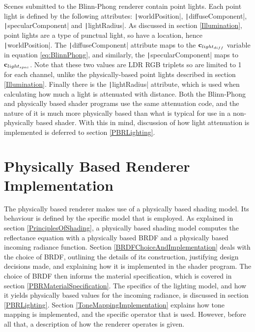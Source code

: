Scenes submitted to the Blinn-Phong renderer contain point lights. Each point light is defined by the following attributes: \texttt|worldPosition|, \texttt|diffuseComponent|, \texttt|specularComponent| and \texttt|lightRadius|. As discussed in section \ref{Illumination}, point lights are a type of punctual light, so have a location, hence \texttt|worldPosition|. The \texttt|diffuseComponent| attribute maps to the \begin{math}\mathbf{c}_{light_{diff}}\end{math} variable in equation \ref{eq:BlinnPhong}, and similarly, the \texttt|specularComponent| maps to \begin{math}\mathbf{c}_{light_{spec}}\end{math}. Note that these two values are LDR RGB triplets so are limited to 1 for each channel, unlike the physically-based point lights described in section \ref{Illumination}. Finally there is the \texttt|lightRadius| attribute, which is used when calculating how much a light is attenuated with distance. Both the Blinn-Phong and physically based shader programs use the same attenuation code, and the nature of it is much more physically based than what is typical for use in a non-physically based shader. With this in mind, discussion of how light attenuation is implemented is deferred to section \ref{PBRLighting}.

\section{Physically Based Renderer Implementation} \label{PBRImplementation}

The physically based renderer makes use of a physically based shading model. Its behaviour is defined by the specific model that is employed. As explained in section \ref{PrinciplesOfShading}, a physically based shading model computes the reflectance equation with a physically based BRDF and a physically based incoming radiance function. Section \ref{BRDFChoiceAndImplementation} deals with the choice of BRDF, outlining the details of its construction, justifying design decisions made, and explaining how it is implemented in the shader program. The choice of BRDF then informs the material specification, which is covered in section \ref{PBRMaterialSpecification}. The specifics of the lighting model, and how it yields physically based values for the incoming radiance, is discussed in section \ref{PBRLighting}. Section \ref{ToneMappingImplementation} explains how tone mapping is implemented, and the specific operator that is used. However, before all that, a description of how the renderer operates is given.

